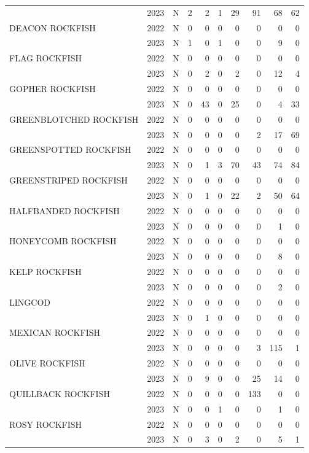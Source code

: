 \documentclass[
  letterpaper,
  DIV=11,
  numbers=noendperiod]{scrartcl}
\begin{document}
\begin{table}
\begin{tabular}[t]{lllrrrrrrr}
 & 2023 & N & 2 & 2 & 1 & 29 & 91 & 68 & 62\\
DEACON ROCKFISH & 2022 & N & 0 & 0 & 0 & 0 & 0 & 0 & 0\\
 & 2023 & N & 1 & 0 & 1 & 0 & 0 & 9 & 0\\
FLAG ROCKFISH & 2022 & N & 0 & 0 & 0 & 0 & 0 & 0 & 0\\
 & 2023 & N & 0 & 2 & 0 & 2 & 0 & 12 & 4\\
GOPHER ROCKFISH & 2022 & N & 0 & 0 & 0 & 0 & 0 & 0 & 0\\
 & 2023 & N & 0 & 43 & 0 & 25 & 0 & 4 & 33\\
GREENBLOTCHED ROCKFISH & 2022 & N & 0 & 0 & 0 & 0 & 0 & 0 & 0\\
 & 2023 & N & 0 & 0 & 0 & 0 & 2 & 17 & 69\\
GREENSPOTTED ROCKFISH & 2022 & N & 0 & 0 & 0 & 0 & 0 & 0 & 0\\
 & 2023 & N & 0 & 1 & 3 & 70 & 43 & 74 & 84\\
GREENSTRIPED ROCKFISH & 2022 & N & 0 & 0 & 0 & 0 & 0 & 0 & 0\\
 & 2023 & N & 0 & 1 & 0 & 22 & 2 & 50 & 64\\
HALFBANDED ROCKFISH & 2022 & N & 0 & 0 & 0 & 0 & 0 & 0 & 0\\
 & 2023 & N & 0 & 0 & 0 & 0 & 0 & 1 & 0\\
HONEYCOMB ROCKFISH & 2022 & N & 0 & 0 & 0 & 0 & 0 & 0 & 0\\
 & 2023 & N & 0 & 0 & 0 & 0 & 0 & 8 & 0\\
KELP ROCKFISH & 2022 & N & 0 & 0 & 0 & 0 & 0 & 0 & 0\\
 & 2023 & N & 0 & 0 & 0 & 0 & 0 & 2 & 0\\
LINGCOD & 2022 & N & 0 & 0 & 0 & 0 & 0 & 0 & 0\\
 & 2023 & N & 0 & 1 & 0 & 0 & 0 & 0 & 0\\
MEXICAN ROCKFISH & 2022 & N & 0 & 0 & 0 & 0 & 0 & 0 & 0\\
 & 2023 & N & 0 & 0 & 0 & 0 & 3 & 115 & 1\\
OLIVE ROCKFISH & 2022 & N & 0 & 0 & 0 & 0 & 0 & 0 & 0\\
 & 2023 & N & 0 & 9 & 0 & 0 & 25 & 14 & 0\\
QUILLBACK ROCKFISH & 2022 & N & 0 & 0 & 0 & 0 & 133 & 0 & 0\\
 & 2023 & N & 0 & 0 & 1 & 0 & 0 & 1 & 0\\
ROSY ROCKFISH & 2022 & N & 0 & 0 & 0 & 0 & 0 & 0 & 0\\
 & 2023 & N & 0 & 3 & 0 & 2 & 0 & 5 & 1\\

\end{tabular}
\end{table}
\end{document}
